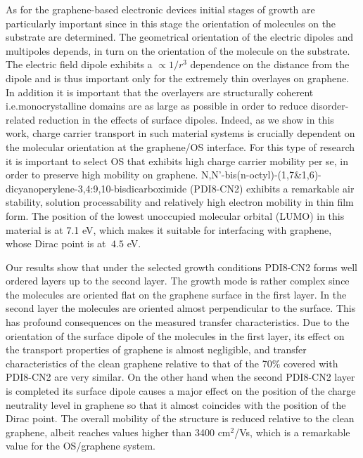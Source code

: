 \documentclass[preprint,aip,jap]{revtex4-2}
\begin{document}
As for the graphene-based electronic devices initial stages of growth are particularly important since in this stage the orientation of molecules on the substrate are determined.
 The geometrical orientation of the electric dipoles and multipoles depends, in turn on the orientation of the molecule on the substrate\cite{geng-2012}.
 The electric field dipole exhibits a $\propto 1/r^{3}$ dependence on the distance from the dipole and is thus important only for the extremely thin overlayes on graphene.
 In addition it is important that the overlayers are structurally coherent i.e.monocrystalline domains are as large as possible in order to reduce disorder-related reduction in the effects of surface dipoles.
 Indeed, as  we show in this work, charge carrier transport in such material systems is crucially dependent on the molecular orientation at the graphene/OS interface.
 For this type of research it is important to select OS that exhibits high charge carrier mobility per se, in order to preserve high mobility on graphene.
   N,N'-bis(n-octyl)-(1,7\&1,6)-dicyanoperylene-3,4:9,10-bisdicarboximide (PDI8-CN2)
 exhibits a remarkable air stability, solution processability and relatively high electron mobility in thin film form\cite{jung-2014,molinari-2009,piliego-2009a}.  The position of the lowest unoccupied molecular orbital (LUMO) in this material is at 7.1 eV\cite{jung-2014}, which makes it suitable for interfacing with graphene, whose Dirac point is at $~4.5$ eV.


Our results show that under the selected growth conditions PDI8-CN2 forms well ordered layers up to the second layer.
 The growth mode is rather complex since the molecules are oriented flat on the graphene surface in the first layer.
 In the second layer the molecules are oriented almost perpendicular to the surface.
 This has profound consequences on the measured transfer characteristics.
 Due to the orientation of the surface dipole of the molecules in the first layer, its effect on the transport properties of graphene is almost negligible, and transfer characteristics of the clean graphene relative to that of the 70\% covered with PDI8-CN2 are very similar. On the other hand when the second PDI8-CN2 layer is completed its surface dipole causes a major effect on the position of the charge neutrality level in graphene so that it almost coincides with the position of the Dirac point.
  The overall mobility of the structure is reduced relative to the clean graphene, albeit reaches values higher than 3400 cm$^{2}$/Vs, which is a remarkable value for the OS/graphene system.
\end{document}
